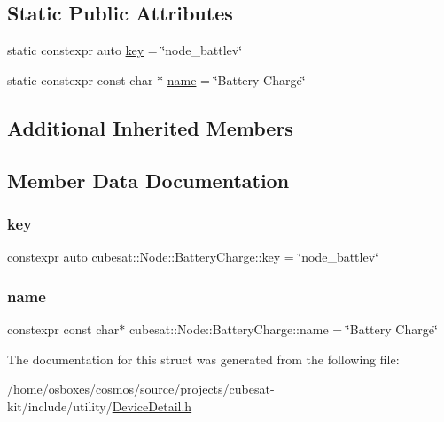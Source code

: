 \subsection*{Static Public Attributes}
\begin{DoxyCompactItemize}
\item 
static constexpr auto \hyperlink{structcubesat_1_1Node_1_1BatteryCharge_a587e3d823545b63cf86a1ebac8742605}{key} = \char`\"{}node\+\_\+battlev\char`\"{}
\item 
static constexpr const char $\ast$ \hyperlink{structcubesat_1_1Node_1_1BatteryCharge_a84060aceda01007b961d8beaca73fc41}{name} = \char`\"{}Battery Charge\char`\"{}
\end{DoxyCompactItemize}
\subsection*{Additional Inherited Members}


\subsection{Member Data Documentation}
\mbox{\label{structcubesat_1_1Node_1_1BatteryCharge_a587e3d823545b63cf86a1ebac8742605}} 
\subsubsection{\texorpdfstring{key}{key}}
{\footnotesize\ttfamily constexpr auto cubesat\+::\+Node\+::\+Battery\+Charge\+::key = \char`\"{}node\+\_\+battlev\char`\"{}\hspace{0.3cm}{\ttfamily [static]}}

\mbox{\label{structcubesat_1_1Node_1_1BatteryCharge_a84060aceda01007b961d8beaca73fc41}} 
\subsubsection{\texorpdfstring{name}{name}}
{\footnotesize\ttfamily constexpr const char$\ast$ cubesat\+::\+Node\+::\+Battery\+Charge\+::name = \char`\"{}Battery Charge\char`\"{}\hspace{0.3cm}{\ttfamily [static]}}



The documentation for this struct was generated from the following file\+:\begin{DoxyCompactItemize}
\item 
/home/osboxes/cosmos/source/projects/cubesat-\/kit/include/utility/\hyperlink{DeviceDetail_8h}{Device\+Detail.\+h}\end{DoxyCompactItemize}
